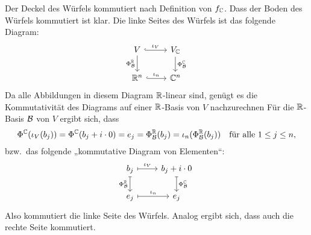\documentclass[a4paper,10pt,numbers=noenddot]{scrartcl}
\begin{document}
Der Deckel des Würfels kommutiert nach Definition von $f_{\mathbb{C}}$.
Dass der Boden des Würfels kommutiert ist klar.
Die linke Seites des Würfels ist das folgende Diagram:
\[
  \begin{tikzcd}
      V
      \arrow[r, hookrightarrow, "\iota_V"]
      \arrow[d, "\Phi^\Rbb_\mc{B}"']
    & V_\Cbb
      \arrow[d, "\Phi^\Cbb_\mc{B}"]
    \\
      \Rbb^n
      \arrow[r, hookrightarrow, "\iota_n"]
    & \Cbb^n
  \end{tikzcd}
\]
Da alle Abbildungen in diesem Diagram $\mathbb{R}$-linear sind, genügt es die Kommutativität des Diagrams auf einer $\mathbb{R}$-Basis von $V$ nachzurechnen
Für die $\mathbb{R}$-Basis $\mathcal{B}$ von $V$ ergibt sich, dass
\[
  \Phi^{\mathbb{C}}(\iota_V(b_j))
  = \Phi^{\mathbb{C}}(b_j + i \cdot 0)
  = e_j
  = \Phi^{\mathbb{R}}_{\mathcal{B}}(b_j)
  = \iota_n(\Phi^{\mathbb{R}}_{\mathcal{B}}(b_j))
  \quad
  \text{für alle $1 \leq j \leq n$},
\]
bzw.\ das folgende „kommutative Diagram von Elementen“:
\[
  \begin{tikzcd}
      b_j
      \arrow[r, maps to, "\iota_V"]
      \arrow[d, maps to, "\Phi^\Rbb_\mc{B}"']
    & b_j + i \cdot 0
      \arrow[d, maps to, "\Phi^\Cbb_\mc{B}"]
    \\
      e_j
      \arrow[r, maps to, "\iota_n"]
    & e_j
  \end{tikzcd}
\]
Also kommutiert die linke Seite des Würfels.
Analog ergibt sich, dass auch die rechte Seite kommutiert.
\end{document}
